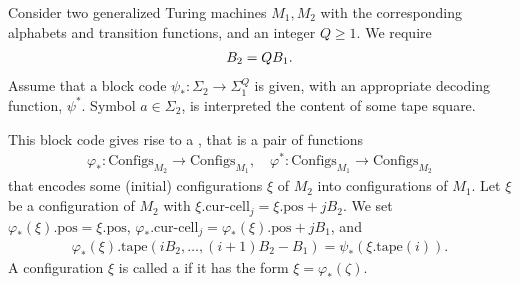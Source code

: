 \documentclass[11pt]{memoir}
\theoremstyle{definition} %
\renewcommand{\ge}{\geq}
\newcommand{\fld}[1]{\ensuremath{\textit{#1\/}}}
\def\B{B}
\newcommand{\Configs}{\mathrm{Configs}}
\newcommand{\pos}{\mathrm{pos}}
\newcommand{\curcell}{\textrm{cur-cell}}
\newcommand{\Q}{Q}
\newcommand{\cDir}{\fld{cDir}}
\newcommand{\tape}{\mathrm{tape}}
\begin{document}
\begin{definition}\label{def:configuration-code}
\begin{sloppypar}
 Consider two generalized Turing machines \( M_{1},M_{2} \) with the corresponding
alphabets and transition functions, and an integer \( \Q\ge 1 \).
We require
\begin{align}\label{eq:B_{2}-B_{1}-\Q}
  \B_{2} = \Q \B_{1}.
\end{align}
Assume that a block code
\(
   \psi_{*}:\Sigma_{2}\to\Sigma_{1}^{\Q}
\)
is given, with an appropriate decoding function, \( \psi^{*} \).
Symbol \( a\in\Sigma_{2} \), is interpreted the content of some tape square.
\end{sloppypar}

This block code gives rise to a , that is a pair of functions
    \begin{align*}
        \varphi_{*} :\Configs_{M_{2}} \to \Configs_{M_{1}},
        \quad
        \varphi^{*}:\Configs_{M_{1}} \to \Configs_{M_{2}}
    \end{align*}
    that encodes some (initial) configurations \( \xi \) of \( M_{2} \) into configurations of \( M_{1} \).
    Let \( \xi \) be a configuration of \( M_{2} \) with \( \xi.\curcell_{j}=\xi.\pos+j\B_{2} \).
    We set \( \varphi_{*}(\xi).\pos = \xi.\pos \), \( \varphi_{*}.\curcell_{j}= \varphi_{*}(\xi).\pos+j\B_{1} \),
  and
\begin{align*}
 \varphi_{*}(\xi).\tape(i\B_{2}, \dots, (i+1)\B_{2} - \B_{1}) = \psi_{*}(\xi.\tape(i)).
 \end{align*}
A configuration \( \xi \) is called a  if it has the form \( \xi=\varphi_{*}(\zeta) \).
 \end{definition}
\end{document}
